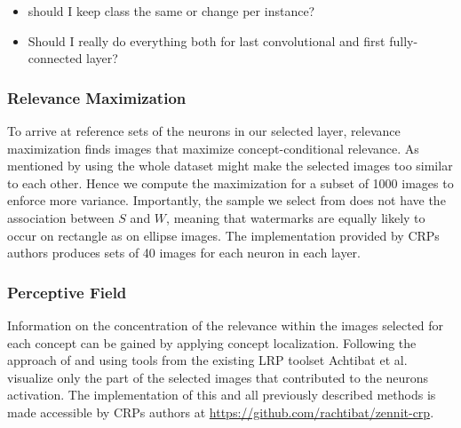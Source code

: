 \begin{itemize}
    \item should I keep class the same or change per instance?
    \item Should I really do everything both for last convolutional and first fully-connected layer?
\end{itemize}

{\color{gray} \subsubsection{Relevance Maximization}
To arrive at reference sets of the neurons in our selected layer, relevance maximization finds images that maximize concept-conditional relevance. As mentioned by \cite{Achtibat2022} using the whole dataset might make the selected images too similar to each other. Hence we compute the maximization for a subset of 1000 images to enforce more variance. Importantly, the sample we select from does not have the association between $S$ and $W$, meaning that watermarks are equally likely to occur on rectangle as on ellipse images. 
The implementation provided by CRPs authors produces sets of 40 images for each neuron in each layer. 

\subsubsection{Perceptive Field}
Information on the concentration of the relevance within the images selected for each concept can be gained by applying concept localization. Following the approach of \cite{Yeh2020} and using tools from the existing LRP toolset \cite{Anders2023} Achtibat et al. visualize only the part of the selected images that contributed to the neurons activation. 
The implementation of this and all previously described methods is made accessible by CRPs authors at \url{https://github.com/rachtibat/zennit-crp}.
}



